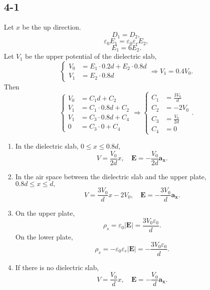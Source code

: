 \documentclass[11pt,a4paper]{article}
\author{\href{liuyh615@sjtu.edu.cn}{Yihao Liu} (515370910207)}
\subtitle{Homework}
\begin{document}
\maketitle

\subsection{4-1}
Let $x$ be the up direction. 
$$D_1=D_2,$$
$$\varepsilon_0E_1=\varepsilon_0\varepsilon_rE_2,$$
$$E_1=6E_2.$$
Let $V_1$ be the upper potential of the dielectric slab,$$\left\{\begin{aligned}V_0&=E_1\cdot0.2d+E_2\cdot0.8d\\V_1&=E_2\cdot 0.8d\end{aligned}\right.\Longrightarrow V_1=0.4V_0.$$
Then
$$\left\{\begin{aligned}V_0&=C_1d+C_2\\V_1&=C_1\cdot 0.8d+C_2\\V_1&=C_3\cdot 0.8d + C_4\\0&=C_3\cdot 0+C_4\end{aligned}\right.\Longrightarrow\left\{\begin{aligned}C_1&=\frac{3V_0}{d}\\C_2&=-2V_0\\C_3&=\frac{V_0}{2d}\\C_4&=0\end{aligned}\right..$$
\begin{enumerate}[label=\alph*)]
\item
In the dielectric slab, $0\leqslant x\leqslant 0.8d$,
$$V=\frac{V_0}{2d}x,\quad\mathbf{E}=-\frac{V_0}{2d}\mathbf{a_x}.$$
\item
In the air space between the dielectric slab and the upper plate, $0.8d\leqslant x\leqslant d,$
$$V=\frac{3V_0}{d}x-2V_0,\quad\mathbf{E}=-\frac{3V_0}{d}\mathbf{a_x}.$$
\item
On the upper plate,
$$\rho_s=\varepsilon_0|\mathbf{E}|=\frac{3V_0\varepsilon_0}{d}.$$
On the lower plate,
$$\rho_s=-\varepsilon_0\varepsilon_r|\mathbf{E}|=-\frac{3V_0\varepsilon_0}{d}.$$
\item
If there is no dielectric slab,
$$V=\frac{V_0}{d}x,\quad \mathbf{E}=-\frac{V_0}{d}\mathbf{a_x}.$$ 
\end{enumerate}
\end{document}
